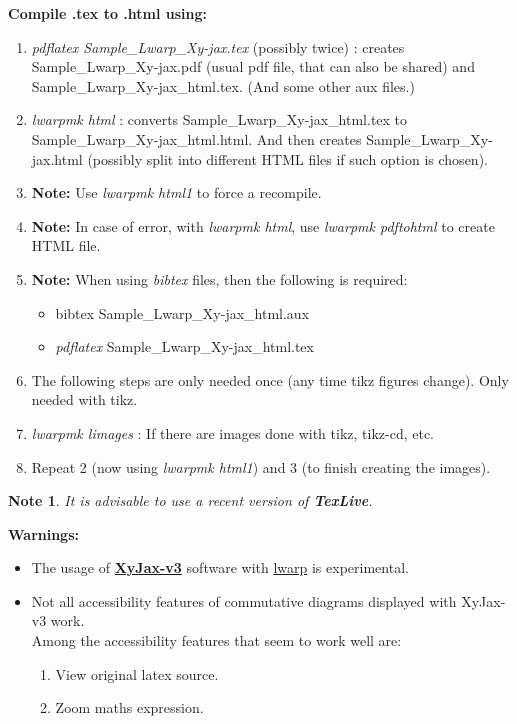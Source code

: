 \documentclass[a4paper,12pt]{article}
\newtheorem*{Note}{Note}
\newtheorem{Fundamental Theorem}{Fundamental Theorem}
\begin{document}
\textbf{Compile .tex to .html using:}

\begin{enumerate}
 \item  \emph{pdflatex Sample\_Lwarp\_Xy-jax.tex} (possibly twice) : creates Sample\_Lwarp\_Xy-jax.pdf  (usual pdf file, that can also be shared) and Sample\_Lwarp\_Xy-jax\_html.tex. (And some other aux files.)
\item  \emph{lwarpmk html} : converts Sample\_Lwarp\_Xy-jax\_html.tex  to Sample\_Lwarp\_Xy-jax\_html.html. And then creates Sample\_Lwarp\_Xy-jax.html (possibly split into different HTML files if such option is chosen).
\item[] \qquad \textbf{Note:} Use \emph{lwarpmk html1} to force a recompile.
\item[] \qquad \textbf{Note:} In case of error, with \emph{lwarpmk html}, use \emph{lwarpmk pdftohtml} to create HTML file.
\item[] \qquad \textbf{Note:} When using \emph{bibtex} files, then the following is required:  \begin{itemize}\item  bibtex  {Sample\_Lwarp\_Xy-jax\_html.aux} \item \emph{pdflatex} Sample\_Lwarp\_Xy-jax\_html.tex\end{itemize}

\item[] The following steps are only needed once (any time tikz figures change). Only needed with tikz.
\item  \emph{lwarpmk limages}  : If there are images done with tikz, tikz-cd, etc.
\item  Repeat 2 (now using \emph{lwarpmk html1}) and 3 (to finish creating the images).
\end{enumerate}
\begin{Note}It is advisable to use a recent version of \emph{\textbf{TexLive}.}\end{Note}




\textbf{Warnings:}
\begin{itemize}
  \item  The usage of  \href{https://github.com/sonoisa/XyJax-v3}{\textbf{XyJax-v3}} software with \href{https://ctan.org/pkg/lwarp}{lwarp} is experimental.
  \item Not all accessibility features of commutative diagrams displayed with XyJax-v3 work.\\ Among the accessibility features that seem to work well are:
 \begin{enumerate}
  \item View original latex source.
  \item Zoom maths expression.
 \end{enumerate}
 \end{itemize}
\end{document}
